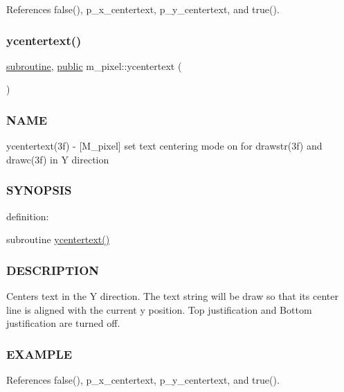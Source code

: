 References false(), p\+\_\+x\+\_\+centertext, p\+\_\+y\+\_\+centertext, and true().

\mbox{\label{namespacem__pixel_a2e32105b5e77abf38768fec6b11376a3}} 
\subsubsection{\texorpdfstring{ycentertext()}{ycentertext()}}
{\footnotesize\ttfamily \hyperlink{M__stopwatch_83_8txt_acfbcff50169d691ff02d4a123ed70482}{subroutine}, \hyperlink{M__stopwatch_83_8txt_a2f74811300c361e53b430611a7d1769f}{public} m\+\_\+pixel\+::ycentertext (\begin{DoxyParamCaption}{ }\end{DoxyParamCaption})}



\subsubsection*{N\+A\+ME}

ycentertext(3f) -\/ \mbox{[}M\+\_\+pixel\mbox{]} set text centering mode on for drawstr(3f) and drawc(3f) in Y direction 

\subsubsection*{S\+Y\+N\+O\+P\+S\+IS}

definition\+:

subroutine \hyperlink{namespacem__pixel_a2e32105b5e77abf38768fec6b11376a3}{ycentertext()}

\subsubsection*{D\+E\+S\+C\+R\+I\+P\+T\+I\+ON}

Centers text in the Y direction. The text string will be draw so that it\textquotesingle{}s center line is aligned with the current y position. Top justification and Bottom justification are turned off.

\subsubsection*{E\+X\+A\+M\+P\+LE}

References false(), p\+\_\+x\+\_\+centertext, p\+\_\+y\+\_\+centertext, and true().



